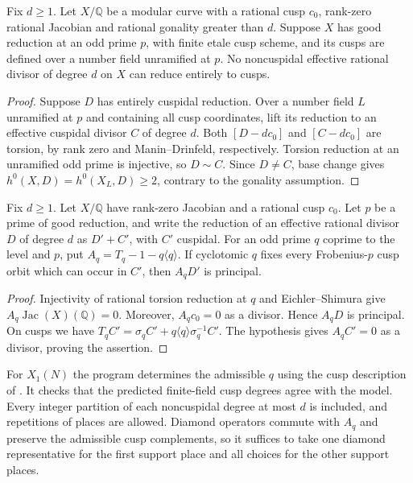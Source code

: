 \begin{lemma}\label{lem:nonic-cont-odd-cuspidal}
Fix $d\ge1$. Let $X/\mathbb Q$ be a modular curve with a rational cusp $c_0$,
rank-zero rational Jacobian and rational gonality greater than $d$.
Suppose $X$ has good reduction at an odd prime $p$, with finite etale
cusp scheme, and its cusps are defined over a number field unramified at $p$.
No noncuspidal effective rational divisor of degree $d$ on $X$ can
reduce entirely to cusps.
\end{lemma}
\begin{proof}
Suppose $D$ has entirely cuspidal reduction. Over a number field $L$
unramified at $p$ and containing all cusp coordinates, lift its reduction
to an effective cuspidal divisor $C$ of degree $d$. Both
$[D-dc_0]$ and $[C-dc_0]$ are torsion, by rank zero and Manin--Drinfeld,
respectively. Torsion reduction at an unramified odd prime is injective,
so $D\sim C$. Since $D\ne C$, base change gives
$h^0(X,D)=h^0(X_L,D)\ge2$, contrary to the gonality assumption.
\end{proof}

\begin{lemma}\label{lem:nonic-cont-hecke}
Fix $d\ge1$. Let $X/\mathbb Q$ have rank-zero Jacobian and a rational cusp $c_0$.
Let $p$ be a prime of good reduction, and write the reduction of an
effective rational divisor $D$ of degree $d$ as $D'+C'$, with $C'$
cuspidal. For an odd prime $q$ coprime to the level and $p$, put
$A_q=T_q-1-q\langle q\rangle$. If cyclotomic $q$ fixes every
Frobenius-$p$ cusp orbit which can occur in $C'$, then $A_qD'$ is principal.
\end{lemma}
\begin{proof}
Injectivity of rational torsion reduction at $q$ and Eichler--Shimura
give $A_q\operatorname{Jac}(X)(\mathbb Q)=0$.
Moreover, $A_qc_0=0$ as a divisor. Hence $A_qD$ is principal.
On cusps we have
$T_qC'=\sigma_q C'+q\langle q\rangle\sigma_q^{-1}C'$.
The hypothesis gives $A_qC'=0$ as a divisor, proving the assertion.
\end{proof}

For $X_1(N)$ the program determines the admissible $q$ using
the cusp description of \cite[Lemma~2.7]{DEHMZ}. It checks that
the predicted finite-field cusp degrees agree with the model.
Every integer partition of each noncuspidal degree at most $d$
is included, and repetitions of places are allowed. Diamond operators
commute with $A_q$ and preserve the admissible cusp complements, so it
suffices to take one diamond representative for the first support place
and all choices for the other support places.


